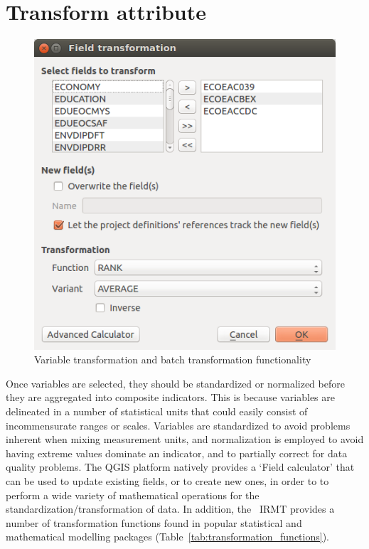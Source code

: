 \section{Transform attribute}

\begin{figure}
    \centering
    \includegraphics[width=\textwidth]{../images/image14}
    \caption{Variable transformation and batch transformation functionality}
    \label{fig:transform_attribute}
\end{figure}

Once variables are selected, they should be standardized or normalized before
they are aggregated into composite indicators. This is because variables are
delineated in a number of statistical units that could easily consist of
incommensurate ranges or scales. Variables are standardized to avoid problems
inherent when mixing measurement units, and normalization is employed to avoid
having extreme values dominate an indicator, and to partially correct for data
quality problems. The QGIS platform natively provides a `Field calculator' that
can be used to update existing fields, or to create new ones, in order to to
perform a wide variety of mathematical operations for the
standardization/transformation of data. In addition, the  IRMT provides a
number of transformation functions found in popular statistical and
mathematical modelling packages (Table~\ref{tab:transformation_functions}).

